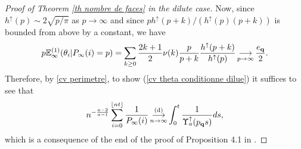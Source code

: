 \documentclass[11pt]{article}
\numberwithin{equation}{section}
\def\E{\mathbb{E}}
\begin{document}
\begin{proof}[Proof of Theorem \ref{th nombre de faces} in the dilute case]
	Now, since $h^\uparrow(p)\sim 2 \sqrt{p/\pi}$ as $p \to \infty$ and since ${p}{h^\uparrow(p+k)}/(h^\uparrow(p)({p+k}))$ is {bounded from above} by a constant, we have
	\begin{equation}\label{eq esp conditionnelle proche de un sur P}
	p\E^{(1)}_\infty(\theta_i \vert P_\infty(i)=p ) = \sum_{k\ge0} \frac{2k+1}{2} \nu(k) \frac{p}{p+k} \frac{h^\uparrow(p+k)}{h^\uparrow(p)}
	\mathop{\longrightarrow}\limits_{p \to \infty}
	\frac{e_{\bf q}}{2}.
	\end{equation}
	Therefore, by \eqref{cv perimetre}, to show (\ref{cv theta conditionne dilue}) it suffices to see that
	$$
	n^{-\frac{a-2}{a-1}} \sum_{i=0}^{\lfloor nt \rfloor} \frac{1}{P_\infty(i)}
	\mathop{\longrightarrow}\limits_{n\to \infty}^{(\mathrm{d})}
	\int_0^t \frac{1}{\Upsilon_a^\uparrow(p_{\bf q} s) }ds,
	$$
	which is a consequence of the end of the proof of Proposition 4.1 in \cite{BC}.
\end{proof}
\end{document}
